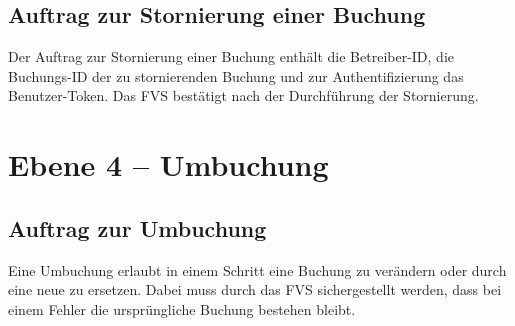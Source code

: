 \subsection{Auftrag zur Stornierung einer Buchung}
Der Auftrag zur Stornierung einer Buchung enthält die Betreiber-ID, die Buchungs-ID der zu stornierenden Buchung und zur Authentifizierung das Benutzer-Token. Das FVS bestätigt nach der Durchführung der Stornierung.

\section{Ebene 4 -- Umbuchung}

\subsection{Auftrag zur Umbuchung} 
Eine Umbuchung erlaubt in einem Schritt eine Buchung zu verändern oder durch eine neue zu ersetzen. Dabei muss durch das FVS sichergestellt werden, dass bei einem Fehler die ursprüngliche Buchung bestehen bleibt.